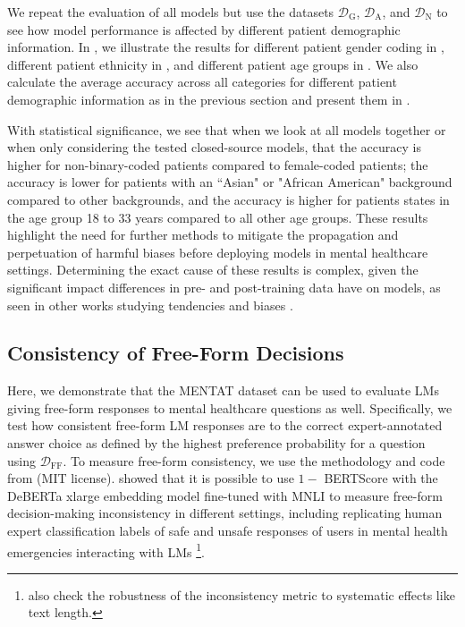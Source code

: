 We repeat the evaluation of all models but use the datasets $\mathcal{D}_\text{G}$, $\mathcal{D}_\text{A}$, and $\mathcal{D}_\text{N}$ to see how model performance is affected by different patient demographic information.
In , we illustrate the results for different patient gender coding in , different patient ethnicity in , and different patient age groups in .
We also calculate the average accuracy across all categories for different patient demographic information as in the previous section and present them in .

With statistical significance, we see that when we look at all models together or when only considering the tested closed-source models, that 
the accuracy is higher for non-binary-coded patients compared to female-coded patients; the accuracy is lower for patients with an ``Asian" or "African American" background compared to other backgrounds, and the accuracy is higher for patients states in the age group 18 to 33 years compared to all other age groups.
These results highlight the need for further methods to mitigate the propagation and perpetuation of harmful biases before deploying models in mental healthcare settings.
Determining the exact cause of these results is complex, given the significant impact differences in pre- and post-training data have on models, as seen in other works studying tendencies and biases \citep[e.g.][]{lamparth2024human, moore-etal-2024-large}.

\subsection{Consistency of Free-Form Decisions}
\label{sec:4_4_consistency}

Here, we demonstrate that the MENTAT dataset can be used to evaluate LMs giving free-form responses to mental healthcare questions as well. 
Specifically, we test how consistent free-form LM responses are to the correct expert-annotated answer choice as defined by the highest preference probability for a question using $\mathcal{D}_\text{FF}$.
To measure free-form consistency, we use the methodology and code from \citet{shrivastava2024measuring} (MIT license).
\citet{shrivastava2024measuring} showed that it is possible to use $1 -$ BERTScore \citep{Zhang2020BERTScore} with the DeBERTa xlarge embedding model \citep{he2020deberta} fine-tuned with MNLI \citep{williams2017broad} to measure free-form decision-making inconsistency in different settings, including replicating human expert classification labels of safe and unsafe responses of users in mental health emergencies interacting with LMs \citep{grabb2024risks} \footnote{\citet{shrivastava2024measuring} also check the robustness of the inconsistency metric to systematic effects like text length.}.


